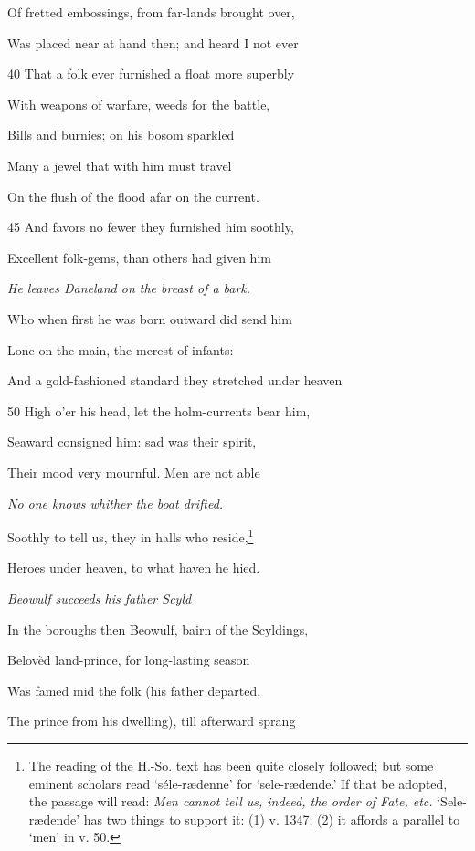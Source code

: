 Of fretted embossings, from far-lands brought over,

Was placed near at hand then; and heard I not ever

40
That a folk ever furnished a float more superbly

With weapons of warfare, weeds for the battle,

Bills and burnies; on his bosom sparkled

Many a jewel that with him must travel

On the flush of the flood afar on the current.

45
And favors no fewer they furnished him soothly,

Excellent folk-gems, than others had given him

\emph{He leaves Daneland
on the breast
of a bark.}

Who when first he was born outward did send him

Lone on the main, the merest of infants:

And a gold-fashioned standard they stretched under heaven

50
High o’er his head, let the holm-currents bear him,

Seaward consigned him: sad was their spirit,

Their mood very mournful. Men are not able

\emph{No one knows
whither the boat
drifted.}

Soothly to tell us, they in halls who reside,\footnote{The reading of the H.-So. text has been quite closely followed; but some
eminent scholars read ‘séle-rædenne’ for ‘sele-rædende.’ If that be adopted,
the passage will read: \emph{Men cannot tell us, indeed, the order of Fate, etc.}
‘Sele-rædende’ has two things to support it: (1) v. 1347; (2) it affords a
parallel to ‘men’ in v. 50.}

Heroes under heaven, to what haven he hied.



\emph{Beowulf succeeds
his father Scyld}

In the boroughs then Beowulf, bairn of the Scyldings,

Belovèd land-prince, for long-lasting season

Was famed mid the folk (his father departed,

The prince from his dwelling), till afterward sprang

